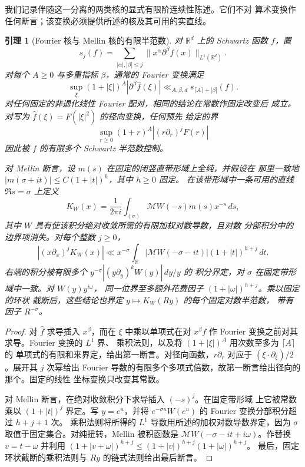 \documentclass[11pt,a4paper]{article}
\numberwithin{equation}{section}
\numberwithin{figure}{section}
\newtheorem{lemma}[theorem]{引理}
\theoremstyle{definition}
\theoremstyle{remark}
\begin{document}
我们记录伴随这一分离的两类核的显式有限阶连续性陈述。它们不对
算术变换作任何断言；该变换必须提供所述的核及其可用的实直线。

\begin{lemma}[Fourier 核与 Mellin 核的有限半范数]
\label{lem:kernel-seminorms}
对 $\mathbb R^d$ 上的 Schwartz 函数 $f$，置
\[
 s_j(f)=\sum_{|\alpha|,|\beta|\le j}
             \|x^\alpha\partial^\beta f(x)\|_{L^1(\mathbb R^d)}.
\]
对每个 $A\ge0$ 与多重指标 $\beta$，通常的 Fourier 变换满足
\[
 \sup_\xi(1+|\xi|)^A|\partial^\beta\widehat f(\xi)|
 \ll_{A,\beta,d}s_{\lceil A\rceil+|\beta|}(f).
\]
对任何固定的非退化线性 Fourier 配对，相同的结论在常数作固定改变后
成立。对写为 $\widehat f(\xi)=F(|\xi|^2)$ 的径向变换，任何预先
给定的界
\[
 \sup_{r\ge0}(1+r)^A|(r\partial_r)^jF(r)|
\]
因此被 $f$ 的有限多个 Schwartz 半范数控制。

对 Mellin 断言，设 $m(s)$ 在固定的闭竖直带形域上全纯，并假设在
那里一致地 $|m(\sigma+it)|\le C(1+|t|)^h$，其中 $h\ge0$ 固定。
在该带形域中一条可用的直线 $\Re s=\sigma$ 上定义
\[
 K_W(x)=\frac1{2\pi i}\int_{(\sigma)}\mathcal MW(-s)m(s)x^{-s}\,ds,
\]
其中 $W$ 具有使该积分绝对收敛所需的有限加权对数导数，且对数
分部积分中的边界项消失。对每个整数 $j\ge0$，
\[
 |(x\partial_x)^jK_W(x)|
 \ll x^{-\sigma}\int_{\mathbb R}
       |\mathcal MW(-\sigma-it)|(1+|t|)^{h+j}\,dt.
\]
右端的积分被有限多个 $y^{-\sigma}|(y\partial_y)^kW(y)|\,dy/y$ 的
积分界定，对 $\sigma$ 在固定带形域中一致。对 $W(y)y^{i\omega}$，
同一位界至多额外花费因子 $(1+|\omega|)^{h+j}$。乘以固定的环状
截断后，这些结论也界定 $y\mapsto K_W(Ry)$ 的每个固定对数半范数，
带有因子 $R^{-\sigma}$。
\end{lemma}

\begin{proof}
对 $\widehat f$ 求导插入 $x^\beta$，而在 $\xi$ 中乘以单项式在对
$x^\beta f$ 作 Fourier 变换之前对其求导。Fourier 变换的 $L^1$ 界、
乘积法则，以及将 $(1+|\xi|)^A$ 用次数至多为 $\lceil A\rceil$ 的
单项式的有限和来界定，给出第一断言。对径向函数，$r\partial_r$
对应于 $(\xi\cdot\partial_\xi)/2$。展开其 $j$ 次幂给出 Fourier
导数的有限多个多项式倍数，故第一断言给出径向的那个。固定的线性
坐标变换只改变其常数。

对 Mellin 断言，在绝对收敛积分下求导插入 $(-s)^j$。在固定带形域
上它被常数乘以 $(1+|t|)^j$ 界定。写 $y=e^u$，并将
$e^{-\sigma u}W(e^u)$ 的 Fourier 变换分部积分超过 $h+j+1$ 次。
乘积法则将所得的 $L^1$ 导数用所述的加权对数导数界定，因为
$\sigma$ 取值于固定集合。对纯扭转，Mellin 被积函数是
$\mathcal MW(-\sigma-it+i\omega)$。作替换 $v=t-\omega$ 并利用
$(1+|v+\omega|)^{h+j}\le(1+|v|)^{h+j}(1+|\omega|)^{h+j}$。
最后，固定环状截断的乘积法则与 $Ry$ 的链式法则给出最后断言。
\end{proof}
\end{document}
